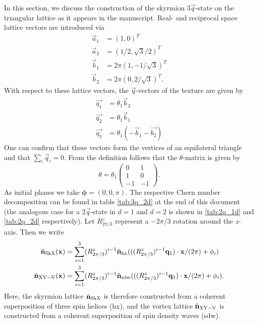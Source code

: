 \documentclass[
    aps,
    prb,
    twocolumn,
    floatfix,
    superscriptaddress,
	10pt
]{revtex4-2}
\begin{document}
In this section, we discuss the construction of the skyrmion $3\vec{q}$-state on the triangular lattice as it appears in the manuscript.
Real- and reciprocal space lattice vectors are introduced via
\begin{align}
	\vec{a}_1 &= (1,0)^T
	\\
	\vec{a}_2 &= (1/2,\sqrt{3}/2 )^T
	\\
	\vec{b}_1 &= 2 \pi (1, -1/\sqrt{3})^T
	\\
	\vec{b}_2 &= 2 \pi (0, 2 / \sqrt{3})^T .
\end{align}
With respect to these lattice vectors, the $\vec{q}$-vectors of the texture are given by
\begin{align}
	\vec{q_1} &= \theta_1 \vec{b}_2 \\
	\vec{q_2} &= \theta_1\vec{b}_1 \\ 
	\vec{q_3} &= \theta_1(-\vec{b}_1- \vec{b_2}) 
\end{align}
One can confirm that these vectors form the vertices of an equilateral triangle and that $\sum_i \vec{q}_i = 0$.
From the definition follows that the $\theta$-matrix is given by
\begin{equation}
	\theta =
	\theta_1 
	\begin{pmatrix}
		0 & 1 \\
		1 & 0 \\
		-1 & -1
	\end{pmatrix} .
\end{equation}
As initial phases we take $\boldsymbol{\phi} = (0,0,\pi)$.  
The respective Chern number decomposition can be found in table \ref{tab:3q_2d} at the end of this document (the analogous case for a 2$\vec{q}$-state in $d=1$ and $d=2$ is shown in \ref{tab:2q_1d} and  \ref{tab:2q_2d} respectively).
Let $R^z_{2\pi/3}$ represent a $-2\pi/3$ rotation around the $z$-axis.
Then we write
\begin{align}
	\hat{\mathbf{n}}_\mathrm{SkX}(\mathbf{x}) &=  \sum_{i=1}^{3 } (R^z_{2\pi/3})^{i-1} \hat{\mathbf{n}}_\mathrm{hx} ( ((R^z_{2\pi/3})^{i-1} \mathbf{q}_1 )\cdot \mathbf{x}/ (2\pi) + \phi_i ) 
	\\
	\hat{\mathbf{n}}_\mathrm{XY-V}(\mathbf{x}) &= \sum_{i=1}^{3 } (R^z_{2\pi/3})^{i-1} \hat{\mathbf{n}}_\mathrm{sdw} ( ((R^z_{2\pi/3})^{i-1} \mathbf{q}_1 )\cdot \mathbf{x}/ (2\pi)  + \phi_i ) .
\end{align}
Here, the skyrmion lattice $\hat{\mathbf{n}}_\mathrm{SkX}$ is therefore constructed from a coherent superposition of three spin helices (hx), and the vortex lattice $\hat{\mathbf{n}}_\mathrm{XY-V}$ is constructed  from a coherent superposition of spin density waves (sdw).
\end{document}
